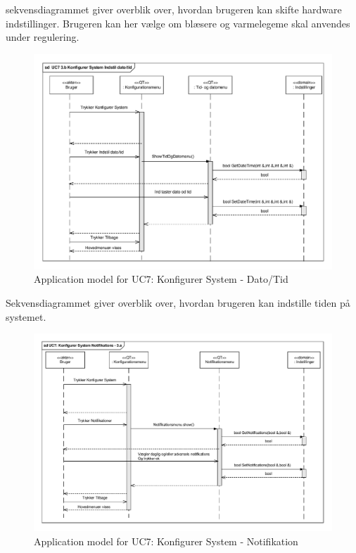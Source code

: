 sekvensdiagrammet giver overblik over, hvordan brugeren kan skifte hardware indstillinger. Brugeren kan her vælge om blæsere og varmelegeme skal anvendes under regulering.

\clearpage

\begin{figure}[!h]
\centering 
\includegraphics[width={\textwidth}, trim=0 0 0 0, clip=true] {../fig/SD_autoGreen_UC_7_Indstil_dato_tid.pdf}
\caption{Application model for UC7: Konfigurer System - Dato/Tid}
\label{fig:SD_UC7_alt2}
\end{figure}

Sekvensdiagrammet giver overblik over, hvordan brugeren kan indstille tiden på systemet.

\clearpage

\begin{figure}[!h]
\centering 
\includegraphics[width={\textwidth}, trim=0 0 0 0, clip=true] {../fig/SD_autoGreen_UC_7_Notifikationer.pdf}
\caption{Application model for UC7: Konfigurer System - Notifikation}
\label{fig:SD_UC7_alt3}
\end{figure}

